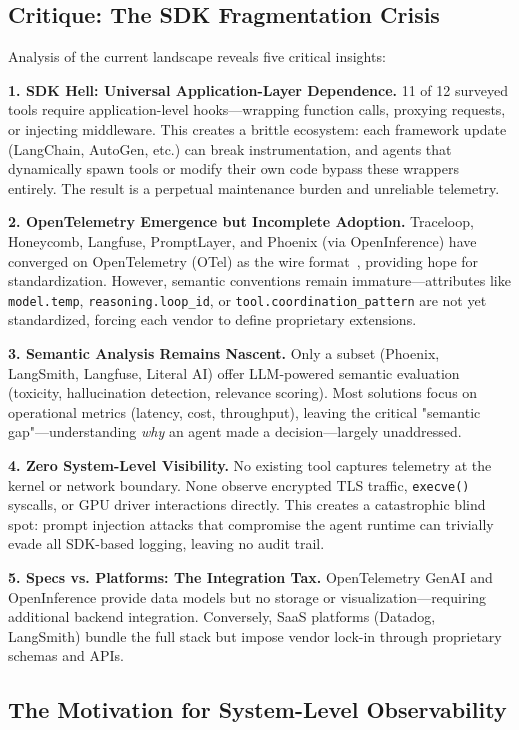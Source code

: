 \documentclass[sigplan,screen，review,9pt]{acmart}
\begin{document}
\subsection{Critique: The SDK Fragmentation Crisis}

Analysis of the current landscape reveals five critical insights:

\textbf{1. SDK Hell: Universal Application-Layer Dependence.} 11 of 12 surveyed tools require application-level hooks—wrapping function calls, proxying requests, or injecting middleware. This creates a brittle ecosystem: each framework update (LangChain, AutoGen, etc.) can break instrumentation, and agents that dynamically spawn tools or modify their own code bypass these wrappers entirely. The result is a perpetual maintenance burden and unreliable telemetry.

\textbf{2. OpenTelemetry Emergence but Incomplete Adoption.} Traceloop, Honeycomb, Langfuse, PromptLayer, and Phoenix (via OpenInference) have converged on OpenTelemetry (OTel) as the wire format~\cite{Liu2025OTel}, providing hope for standardization. However, semantic conventions remain immature—attributes like \texttt{model.temp}, \texttt{reasoning.loop\_id}, or \texttt{tool.coordination\_pattern} are not yet standardized, forcing each vendor to define proprietary extensions.

\textbf{3. Semantic Analysis Remains Nascent.} Only a subset (Phoenix, LangSmith, Langfuse, Literal AI) offer LLM-powered semantic evaluation (toxicity, hallucination detection, relevance scoring). Most solutions focus on operational metrics (latency, cost, throughput), leaving the critical "semantic gap"—understanding \emph{why} an agent made a decision—largely unaddressed.

\textbf{4. Zero System-Level Visibility.} No existing tool captures telemetry at the kernel or network boundary. None observe encrypted TLS traffic, \texttt{execve()} syscalls, or GPU driver interactions directly. This creates a catastrophic blind spot: prompt injection attacks that compromise the agent runtime can trivially evade all SDK-based logging, leaving no audit trail.

\textbf{5. Specs vs. Platforms: The Integration Tax.} OpenTelemetry GenAI and OpenInference provide data models but no storage or visualization—requiring additional backend integration. Conversely, SaaS platforms (Datadog, LangSmith) bundle the full stack but impose vendor lock-in through proprietary schemas and APIs.

\subsection{The Motivation for System-Level Observability}
\end{document}
